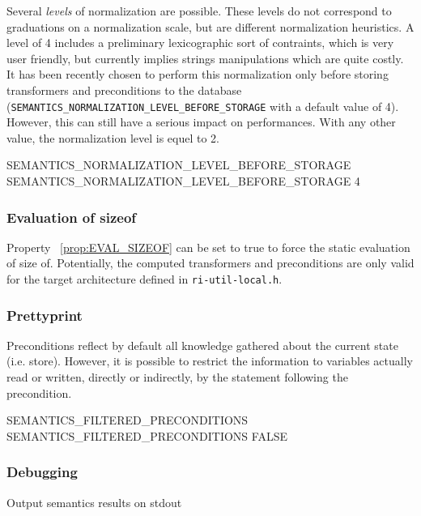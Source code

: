 \documentclass[a4paper]{report}
\newcommand{\PipsPropRef}[1]{\texttt{\detokenize{#1}}~\ref{prop:#1}}
\begin{document}
Several \emph{levels} of normalization are possible. These levels do
not correspond to graduations on a normalization scale, but are
different normalization heuristics. A level of 4 includes a
preliminary lexicographic sort of contraints, which is very user
friendly, but currently implies strings manipulations which are quite
costly. It has been recently chosen to perform this normalization only
before storing transformers and preconditions to the database
(\texttt{SEMANTICS\_NORMALIZATION\_LEVEL\_BEFORE\_STORAGE} with a
default value of 4). However, this can still have a serious impact on
performances. With any other value, the normalization level is equel to 2.

\begin{PipsProp}{SEMANTICS_NORMALIZATION_LEVEL_BEFORE_STORAGE}
SEMANTICS_NORMALIZATION_LEVEL_BEFORE_STORAGE 4
\end{PipsProp}

\subsubsection{Evaluation of sizeof}

Property \PipsPropRef{EVAL_SIZEOF} can be set to true to force the
static evaluation of size of. Potentially, the computed transformers
and preconditions are only valid for the target architecture defined
in \verb/ri-util-local.h/.

\subsubsection{Prettyprint}

Preconditions reflect by default all knowledge gathered about the current
state (i.e. store). However, it is possible to restrict the information to
variables actually read or written, directly or indirectly, by the
statement following the precondition.

\begin{PipsProp}{SEMANTICS_FILTERED_PRECONDITIONS}
SEMANTICS_FILTERED_PRECONDITIONS FALSE
\end{PipsProp}


\subsubsection{Debugging}

Output semantics results on stdout
\end{document}
